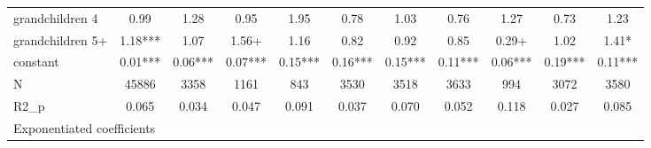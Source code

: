 {\begin{tabular}{l*{10}{c}}
grandchildren 4&        0.99   &        1.28   &        0.95   &        1.95   &        0.78   &        1.03   &        0.76   &        1.27   &        0.73   &        1.23   \\
grandchildren 5+&        1.18***&        1.07   &        1.56+  &        1.16   &        0.82   &        0.92   &        0.85   &        0.29+  &        1.02   &        1.41*  \\
constant    &        0.01***&        0.06***&        0.07***&        0.15***&        0.16***&        0.15***&        0.11***&        0.06***&        0.19***&        0.11***\\
\hline
N           &       45886   &        3358   &        1161   &         843   &        3530   &        3518   &        3633   &         994   &        3072   &        3580   \\
R2\_p        &       0.065   &       0.034   &       0.047   &       0.091   &       0.037   &       0.070   &       0.052   &       0.118   &       0.027   &       0.085   \\
\hline\hline
\multicolumn{11}{l}{\footnotesize Exponentiated coefficients}\\
\end{tabular}
}
